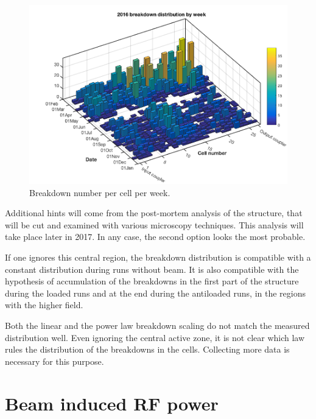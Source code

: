 \begin{figure}[h]
\centering 
\includegraphics[scale=0.4]{pictures/week_distr_3D.png}
\caption{Breakdown number per cell per week. }
\label{BD_3d}
\end{figure}

Additional hints will come from the post-mortem analysis of the structure, that will be cut and examined with various microscopy techniques. This analysis will take place later in 2017. In any case, the second option looks the most probable. 

If one ignores this central region, the breakdown distribution is compatible with a constant distribution during runs without beam. It is also compatible with the hypothesis of accumulation of the breakdowns in  the first part of the structure during the loaded runs and at the end during the antiloaded runs, in the regions with the higher field.

Both the linear and the power law breakdown scaling do not match the measured distribution well. Even ignoring the central active zone, it is not clear which law rules the distribution of the breakdowns in the cells. Collecting more data is necessary for this purpose.

\section[Beam induced RF power]{Beam induced RF power}

